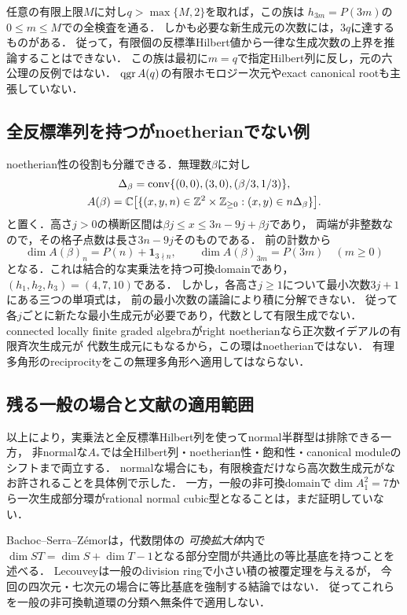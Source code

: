 \documentclass[11pt,a4paper]{ltjsarticle}
\begin{document}
任意の有限上限$M$に対し$q>\max\{M,2\}$を取れば，この族は
$h_{3m}=P(3m)$の$0\leq m\leq M$での全検査を通る．
しかも必要な新生成元の次数には，$3q$に達するものがある．
従って，有限個の反標準Hilbert値から一律な生成次数の上界を推論することはできない．
この族は最初に$m=q$で指定Hilbert列に反し，元の六公理の反例ではない．
$\operatorname{qgr} A(q)$の有限ホモロジー次元やexact canonical rootも主張していない．

\subsection{全反標準列を持つがnoetherianでない例}
noetherian性の役割も分離できる．無理数$\beta$に対し
\[
 \begin{gathered}
 \Delta_\beta=\operatorname{conv}\{(0,0),(3,0),(\beta/3,1/3)\},\\
 A(\beta)=\mathbb C\bigl[\{(x,y,n)\in\mathbb Z^2\times\mathbb Z_{\geq0}:(x,y)\in n\Delta_\beta\}\bigr].
 \end{gathered}
\]
と置く．高さ$j>0$の横断区間は$\beta j\leq x\leq3n-9j+\beta j$であり，
両端が非整数なので，その格子点数は長さ$3n-9j$そのものである．
前の計数から
\[
 \dim A(\beta)_n=P(n)+\mathbf1_{3\nmid n},
 \qquad \dim A(\beta)_{3m}=P(3m)\quad(m\geq0)
\]
となる．これは結合的な実乗法を持つ可換domainであり，$(h_1,h_2,h_3)=(4,7,10)$である．
しかし，各高さ$j\geq1$について最小次数$3j+1$にある三つの単項式は，
前の最小次数の議論により積に分解できない．
従って各$j$ごとに新たな最小生成元が必要であり，代数として有限生成でない．
connected locally finite graded algebraがright noetherianなら正次数イデアルの有限斉次生成元が
代数生成元にもなるから，この環はnoetherianではない．
有理多角形のreciprocityをこの無理多角形へ適用してはならない．

\subsection{残る一般の場合と文献の適用範囲}
以上により，実乗法と全反標準Hilbert列を使ってnormal半群型は排除できる一方，
非normalな$A_*$では全Hilbert列・noetherian性・飽和性・canonical moduleのシフトまで両立する．
normalな場合にも，有限検査だけなら高次数生成元がなお許されることを具体例で示した．
一方，一般の非可換domainで$\dim A_1^2=7$から一次生成部分環がrational normal cubic型となることは，まだ証明していない．

Bachoc--Serra--Z\'emor\cite[Theorem 33]{BSZVosper}は，代数閉体の
\emph{可換拡大体}内で$\dim ST=\dim S+\dim T-1$となる部分空間が共通比の等比基底を持つことを述べる．
Lecouvey\cite[Theorem 5.8]{LecouveyDimension}は一般のdivision ringで小さい積の被覆定理を与えるが，
今回の四次元・七次元の場合に等比基底を強制する結論ではない．
従ってこれらを一般の非可換軌道環の分類へ無条件で適用しない．
\end{document}
